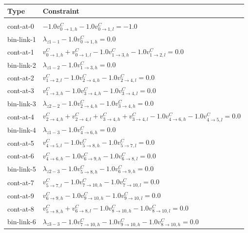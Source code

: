 \documentclass[11pt]{article}
\begin{document}
\begin{tabular}{l l}
\textbf{Type} & \textbf{Constraint}\\\hline\\
    cont-at-0 & $-1.0 v^C_{0 \rightarrow 1, h} -1.0 v^C_{0 \rightarrow 1, l} = -1.0$\\
    bin-link-1 & $\lambda_{z1-1} -1.0 v^C_{0 \rightarrow 1, h} = 0.0$\\
    cont-at-1 & $v^C_{0 \rightarrow 1, h} + v^C_{0 \rightarrow 1, l} -1.0 v^C_{1 \rightarrow 3, h} -1.0 v^C_{1 \rightarrow 2, l} = 0.0$\\
    bin-link-2 & $\lambda_{z1-2} -1.0 v^C_{1 \rightarrow 3, h} = 0.0$\\
    cont-at-2 & $v^C_{1 \rightarrow 2, l} -1.0 v^C_{2 \rightarrow 4, h} -1.0 v^C_{2 \rightarrow 4, l} = 0.0$\\
    cont-at-3 & $v^C_{1 \rightarrow 3, h} -1.0 v^C_{3 \rightarrow 4, h} -1.0 v^C_{3 \rightarrow 4, l} = 0.0$\\
    bin-link-3 & $\lambda_{z2-2} -1.0 v^C_{2 \rightarrow 4, h} -1.0 v^C_{3 \rightarrow 4, h} = 0.0$\\
    cont-at-4 & $v^C_{2 \rightarrow 4, h} + v^C_{2 \rightarrow 4, l} + v^C_{3 \rightarrow 4, h} + v^C_{3 \rightarrow 4, l} -1.0 v^C_{4 \rightarrow 6, h} -1.0 v^C_{4 \rightarrow 5, l} = 0.0$\\
    bin-link-4 & $\lambda_{z1-3} -1.0 v^C_{4 \rightarrow 6, h} = 0.0$\\
    cont-at-5 & $v^C_{4 \rightarrow 5, l} -1.0 v^C_{5 \rightarrow 8, h} -1.0 v^C_{5 \rightarrow 7, l} = 0.0$\\
    cont-at-6 & $v^C_{4 \rightarrow 6, h} -1.0 v^C_{6 \rightarrow 9, h} -1.0 v^C_{6 \rightarrow 8, l} = 0.0$\\
    bin-link-5 & $\lambda_{z2-3} -1.0 v^C_{5 \rightarrow 8, h} -1.0 v^C_{6 \rightarrow 9, h} = 0.0$\\
    cont-at-7 & $v^C_{5 \rightarrow 7, l} -1.0 v^C_{7 \rightarrow 10, h} -1.0 v^C_{7 \rightarrow 10, l} = 0.0$\\
    cont-at-9 & $v^C_{6 \rightarrow 9, h} -1.0 v^C_{9 \rightarrow 10, h} -1.0 v^C_{9 \rightarrow 10, l} = 0.0$\\
    cont-at-8 & $v^C_{5 \rightarrow 8, h} + v^C_{6 \rightarrow 8, l} -1.0 v^C_{8 \rightarrow 10, h} -1.0 v^C_{8 \rightarrow 10, l} = 0.0$\\
    bin-link-6 & $\lambda_{z3-3} -1.0 v^C_{7 \rightarrow 10, h} -1.0 v^C_{9 \rightarrow 10, h} -1.0 v^C_{8 \rightarrow 10, h} = 0.0$\\

\end{tabular}
\end{document}
